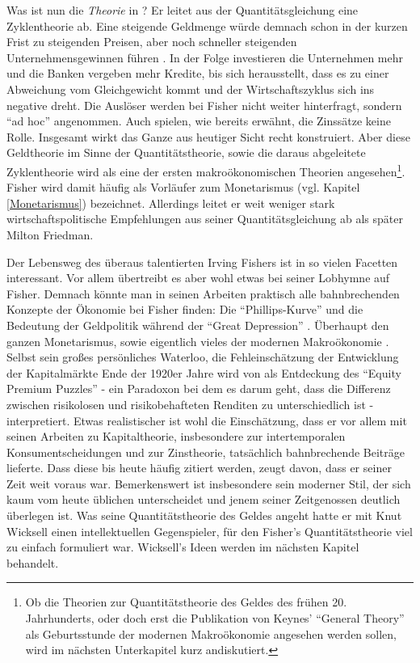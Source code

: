 Was ist nun die \textit{Theorie} in \textcite{Fisher1911}? Er leitet aus der Quantitätsgleichung eine Zyklentheorie ab. Eine steigende Geldmenge würde demnach schon in der kurzen Frist zu steigenden Preisen, aber noch schneller steigenden Unternehmensgewinnen führen \parencite[S. 59]{Fisher1911}. In der Folge investieren die Unternehmen mehr und die Banken vergeben mehr Kredite, bis sich herausstellt, dass es zu einer Abweichung vom Gleichgewicht kommt und der Wirtschaftszyklus sich ins negative dreht. Die Auslöser werden bei Fisher nicht weiter hinterfragt, sondern "`ad hoc"' angenommen. Auch spielen, wie bereits erwähnt, die Zinssätze keine Rolle. Insgesamt wirkt das Ganze aus heutiger Sicht recht konstruiert. Aber diese Geldtheorie im Sinne der Quantitätstheorie, sowie die daraus abgeleitete Zyklentheorie wird als eine der ersten makroökonomischen Theorien angesehen\footnote{Ob die Theorien zur Quantitätstheorie des Geldes des frühen 20. Jahrhunderts, oder doch erst die Publikation von Keynes' "`General Theory"' als Geburtsstunde der modernen Makroökonomie angesehen werden sollen, wird im nächsten Unterkapitel kurz andiskutiert.}. Fisher wird damit häufig als Vorläufer zum Monetarismus (vgl. Kapitel \ref{Monetarismus}) bezeichnet. Allerdings leitet er weit weniger stark wirtschaftspolitische Empfehlungen aus seiner Quantitätsgleichung ab als später Milton Friedman.

Der Lebensweg des überaus talentierten Irving Fishers ist in so vielen Facetten interessant. Vor allem \textcite{Dimand2005} übertreibt es aber wohl etwas bei seiner Lobhymne auf Fisher. Demnach könnte man in seinen Arbeiten praktisch alle bahnbrechenden Konzepte der Ökonomie bei Fisher finden: Die "`Phillips-Kurve"' und die Bedeutung der Geldpolitik während der "`Great Depression"' \parencite[S. 7]{Dimand2005}. Überhaupt den ganzen Monetarismus, sowie eigentlich vieles der modernen Makroökonomie  \parencite[S. 10]{Dimand2005}. Selbst sein großes persönliches Waterloo, die Fehleinschätzung der Entwicklung der Kapitalmärkte Ende der 1920er Jahre wird von \textcite[S. 9]{Dimand2005} als Entdeckung des "`Equity Premium Puzzles"' - ein Paradoxon bei dem es darum geht, dass die Differenz zwischen risikolosen und risikobehafteten Renditen zu unterschiedlich ist - interpretiert. Etwas realistischer ist wohl die Einschätzung, dass er vor allem mit seinen Arbeiten zu Kapitaltheorie, insbesondere zur intertemporalen Konsumentscheidungen und zur Zinstheorie, tatsächlich bahnbrechende Beiträge lieferte. Dass diese bis heute häufig zitiert werden, zeugt davon, dass er seiner Zeit weit voraus war. Bemerkenswert ist insbesondere sein moderner Stil, der sich kaum vom heute üblichen unterscheidet und jenem seiner Zeitgenossen deutlich überlegen ist. Was seine Quantitätstheorie des Geldes angeht hatte er mit Knut Wicksell einen intellektuellen Gegenspieler, für den Fisher's Quantitätstheorie viel zu einfach formuliert war. Wicksell's Ideen werden im nächsten Kapitel behandelt.

